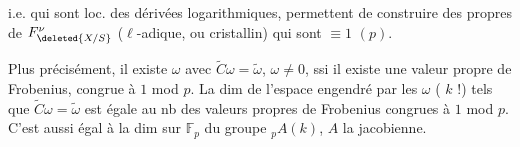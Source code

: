 
i.e. qui sont loc. des dérivées logarithmiques, permettent de construire des  propres de $F_{\deleted{X/S}}^{\nu}$  ($\ell$-adique, ou cristallin) qui sont $\equiv1$ $(p)$.

Plus précisément, il existe $\omega$ avec $\widetilde C\omega=\widetilde\omega$, $\omega\ne0$, ssi il existe une valeur propre de Frobenius, congrue à $1$ mod $p$. La dim de l'espace  engendré par les $\omega$ ( $k$ !) tels que $\widetilde C\omega=\widetilde\omega$ est égale au nb des valeurs propres de Frobenius congrues à $1$ mod $p$. C'est aussi égal à la dim sur $\mathbb F_p$ du groupe  $ {}_pA(k)$, $A$ la jacobienne.


